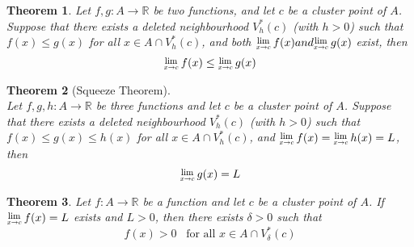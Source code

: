 \documentclass[8pt]{article}
\newcommand{\Lim}[1]{\raisebox{0.5ex}{\scalebox{0.8}{$\displaystyle \lim_{#1}\;$}}}
\newtheorem{theorem}{Theorem}[section]
\theoremstyle{definition}
\begin{document}
\begin{theorem}
\normalfont Let $f,g: A\to \mathbb{R}$ be two functions, and let $c$ be a cluster point of $A$. Suppose that there exists a deleted neighbourhood $V_h^\ast(c)$ (with $h>0$) such that $f(x)\leq g(x)$ for all $x\in A\cap V_h^\ast (c)$, and both $\Lim{x\to c}f(x)and \Lim{x\to c}g(x)$ exist, then
\[
\Lim{x\to c}f(x)\leq \Lim{x\to c}g(x)
\]
\end{theorem}
\begin{theorem}[Squeeze Theorem]
\hfill\\\normalfont Let $f,g,h: A\to\mathbb{R}$ be three functions and let $c$ be a cluster point of $A$. Suppose that there exists a deleted neighbourhood $V_h^\ast(c)$ (with $h>0$) such that $f(x)\leq g(x)\leq h(x)$ for all  $x\in A\cap V_h^\ast (c)$, and $\Lim{x\to c}f(x)=\Lim{x\to c}h(x)=L$, then
\[
\Lim{x\to c}g(x)=L
\]
\end{theorem}
\begin{theorem}\normalfont Let $f:A\to \mathbb{R}$ be a function and let $c$ be a cluster point of $A$. If $\Lim{x\to c}f(x)=L$ exists and $L>0$, then there exists $\delta>0$ such that
\[
f(x)>0\;\;\;\text{for all }x\in A\cap V_\delta^\ast(c)
\]
\end{theorem}
\end{document}
